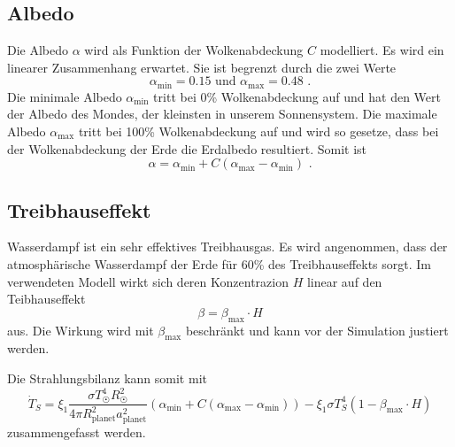 \begin{refsection}
\subsection{Albedo}
Die Albedo $\alpha$ wird als Funktion der Wolkenabdeckung $C$ modelliert. Es wird ein linearer Zusammenhang erwartet. Sie ist begrenzt durch die zwei Werte
\begin{equation}
\alpha_{\text{min}} = 0.15 \text{ und } \alpha_{\text{max}} = 0.48 \text{ .}
\end{equation}
Die minimale Albedo $\alpha_{\text{min}}$ tritt bei 0\% Wolkenabdeckung auf und hat den Wert der Albedo des Mondes, der kleinsten in unserem Sonnensystem. Die maximale Albedo $\alpha_{\text{max}}$ tritt bei 100\% Wolkenabdeckung auf und wird so gesetze, dass bei der Wolkenabdeckung der Erde die Erdalbedo resultiert. Somit ist
\begin{equation}
\alpha = \alpha_{\text{min}} + C(\alpha_{\text{max}} - \alpha_{\text{min}}) \text{ .}
\end{equation}

\subsection{Treibhauseffekt}
Wasserdampf ist ein sehr effektives Treibhausgas. Es wird angenommen, dass der atmosphärische Wasserdampf der Erde für 60\% des Treibhauseffekts sorgt. \cite{planeten:treibhauseffekt}  
Im verwendeten Modell wirkt sich deren Konzentrazion $H$ linear auf den Teibhauseffekt 
\begin{equation}
\beta  = \beta_{\text{max}} \cdot H
\end{equation}
aus. Die Wirkung wird mit $\beta_{\text{max}}$ beschränkt und kann vor der Simulation justiert werden.

Die Strahlungsbilanz kann somit mit
\begin{equation}
\dot{T}_S = \xi_1 \frac{\sigma T_{\astrosun}^4 R_{\astrosun}^2}{4 \pi R_{\text{planet}}^2 a_{\text{planet}}^2} (\alpha_{\text{min}} + C(\alpha_{\text{max}} - \alpha_{\text{min}})) - \xi_1 \sigma T_{S}^4  (1 - \beta_{\text{max}} \cdot H)
\end{equation}
zusammengefasst werden.


\end{refsection}
